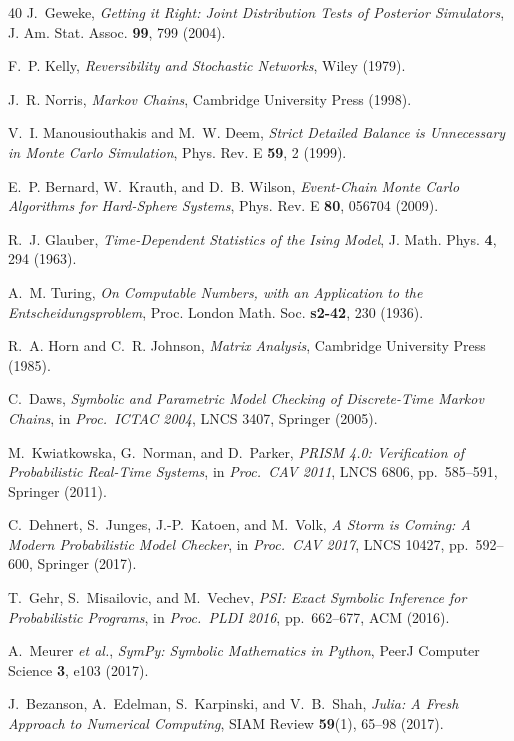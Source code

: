 \documentclass[twocolumn,10pt]{article}
\begin{document}
\begin{thebibliography}{40}
J.~Geweke,
\textit{Getting it Right: Joint Distribution Tests of Posterior Simulators},
J. Am. Stat. Assoc. \textbf{99}, 799 (2004).

F.~P. Kelly,
\textit{Reversibility and Stochastic Networks},
Wiley (1979).

J.~R. Norris,
\textit{Markov Chains},
Cambridge University Press (1998).

V.~I. Manousiouthakis and M.~W. Deem,
\textit{Strict Detailed Balance is Unnecessary in Monte Carlo Simulation},
Phys. Rev. E \textbf{59}, 2 (1999).

E.~P. Bernard, W.~Krauth, and D.~B. Wilson,
\textit{Event-Chain Monte Carlo Algorithms for Hard-Sphere Systems},
Phys. Rev. E \textbf{80}, 056704 (2009).

R.~J. Glauber,
\textit{Time-Dependent Statistics of the Ising Model},
J. Math. Phys. \textbf{4}, 294 (1963).

A.~M. Turing,
\textit{On Computable Numbers, with an Application to the
Entscheidungsproblem},
Proc. London Math. Soc. \textbf{s2-42}, 230 (1936).

R.~A. Horn and C.~R. Johnson,
\textit{Matrix Analysis},
Cambridge University Press (1985).

C.~Daws,
\textit{Symbolic and Parametric Model Checking of Discrete-Time Markov
  Chains},
in \textit{Proc.\ ICTAC 2004}, LNCS 3407, Springer (2005).

M.~Kwiatkowska, G.~Norman, and D.~Parker,
\textit{PRISM 4.0: Verification of Probabilistic Real-Time Systems},
in \textit{Proc.\ CAV 2011}, LNCS 6806, pp.~585--591, Springer (2011).

C.~Dehnert, S.~Junges, J.-P.~Katoen, and M.~Volk,
\textit{A Storm is Coming: A Modern Probabilistic Model Checker},
in \textit{Proc.\ CAV 2017}, LNCS 10427, pp.~592--600, Springer (2017).

T.~Gehr, S.~Misailovic, and M.~Vechev,
\textit{PSI: Exact Symbolic Inference for Probabilistic Programs},
in \textit{Proc.\ PLDI 2016}, pp.~662--677, ACM (2016).

A.~Meurer \textit{et al.},
\textit{SymPy: Symbolic Mathematics in Python},
PeerJ Computer Science \textbf{3}, e103 (2017).

J.~Bezanson, A.~Edelman, S.~Karpinski, and V.~B.~Shah,
\textit{Julia: A Fresh Approach to Numerical Computing},
SIAM Review \textbf{59}(1), 65--98 (2017).


\end{thebibliography}
\end{document}
